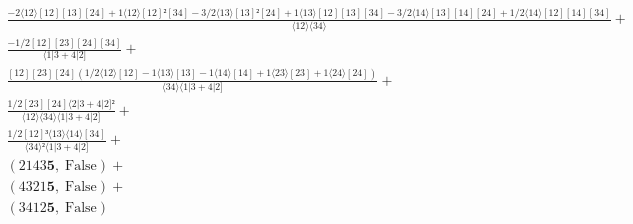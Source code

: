 \documentclass[varwidth, border=5pt]{standalone}
\begin{document}
\begin{my}
$\begin{gathered}
\scriptscriptstyle\frac{-2⟨12⟩[12][13][24]+1⟨12⟩[12]²[34]-3/2⟨13⟩[13]²[24]+1⟨13⟩[12][13][34]-3/2⟨14⟩[13][14][24]+1/2⟨14⟩[12][14][34]}{⟨12⟩⟨34⟩} +\\
\scriptscriptstyle\frac{-1/2[12][23][24][34]}{⟨1|3+4|2]} +\\
\scriptscriptstyle\frac{[12][23][24](1/2⟨12⟩[12]-1⟨13⟩[13]-1⟨14⟩[14]+1⟨23⟩[23]+1⟨24⟩[24])}{⟨34⟩⟨1|3+4|2]} +\\
\scriptscriptstyle\frac{1/2[23][24]⟨2|3+4|2]²}{⟨12⟩⟨34⟩⟨1|3+4|2]} +\\
\scriptscriptstyle\frac{1/2[12]³⟨13⟩⟨14⟩[34]}{⟨34⟩²⟨1|3+4|2]} +\\
\scriptscriptstyle(2143𝟓,\;\text{False}) +\\
\scriptscriptstyle(4321𝟓,\;\text{False}) +\\
\scriptscriptstyle(3412𝟓,\;\text{False}) \phantom{+}
\end{gathered}$
\end{my}
\end{document}
